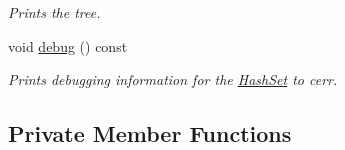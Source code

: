 \begin{DoxyCompactItemize}
\begin{DoxyCompactList}\small\item\em Prints the tree. \end{DoxyCompactList}\item 
\hypertarget{class_tree_set_a05d9c633b020f9e759997f4ccb863ca2}{void \hyperlink{class_tree_set_a05d9c633b020f9e759997f4ccb863ca2}{debug} () const }\label{class_tree_set_a05d9c633b020f9e759997f4ccb863ca2}

\begin{DoxyCompactList}\small\item\em Prints debugging information for the \hyperlink{class_hash_set}{Hash\-Set} to cerr. \end{DoxyCompactList}\end{DoxyCompactItemize}
\subsection*{Private Member Functions}

